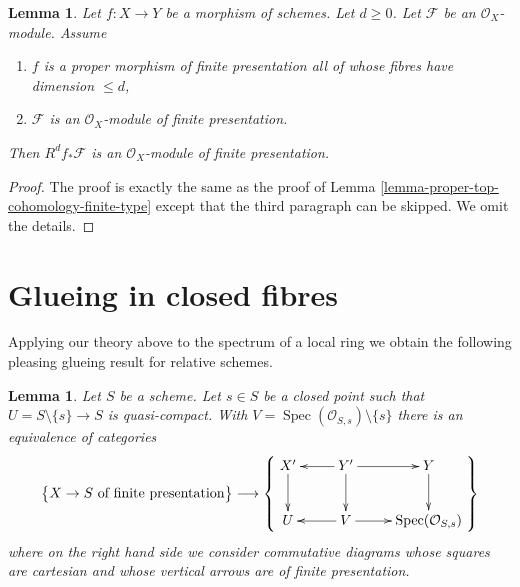 \documentclass{stacks-project}
\theoremstyle{plain}
\newtheorem{lemma}[subsection]{Lemma}
\theoremstyle{definition}
\theoremstyle{remark}
\numberwithin{equation}{subsection}
\def\Spec{\mathop{\mathrm{Spec}}}
\begin{document}
\begin{lemma}
\label{lemma-proper-top-cohomology-finite-presentation}
Let $f : X \to Y$ be a morphism of schemes. Let $d \geq 0$.
Let $\mathcal{F}$ be an $\mathcal{O}_X$-module. Assume
\begin{enumerate}
\item $f$ is a proper morphism of finite presentation
all of whose fibres have dimension $\leq d$,
\item $\mathcal{F}$ is an $\mathcal{O}_X$-module of finite presentation.
\end{enumerate}
Then $R^df_*\mathcal{F}$ is an $\mathcal{O}_X$-module
of finite presentation.
\end{lemma}

\begin{proof}
The proof is exactly the same as the proof of
Lemma \ref{lemma-proper-top-cohomology-finite-type}
except that the third paragraph can be skipped.
We omit the details.
\end{proof}











\section{Glueing in closed fibres}
\label{section-change-over-closed-points}

\noindent
Applying our theory above to the spectrum of a local ring we obtain
the following pleasing glueing result for relative schemes.

\begin{lemma}
\label{lemma-glueing-near-closed-point}
Let $S$ be a scheme. Let $s \in S$ be a closed point such that
$U = S \setminus \{s\} \to S$ is quasi-compact. With
$V = \Spec(\mathcal{O}_{S, s}) \setminus \{s\}$ there is
an equivalence of categories
$$
\left\{
\begin{matrix}
X \to S\text{ of finite presentation}
\end{matrix}
\right\}
\longrightarrow
\left\{
\vcenter{
\xymatrix{
X' \ar[d] & Y' \ar[d] \ar[l] \ar[r] & Y \ar[d] \\
U & V \ar[l] \ar[r] & \Spec(\mathcal{O}_{S, s})
}
}
\right\}
$$
where on the right hand side we consider commutative diagrams
whose squares are cartesian and whose vertical arrows are
of finite presentation.
\end{lemma}
\end{document}
